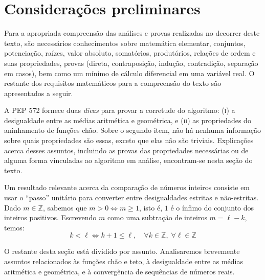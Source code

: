\section*{Considerações preliminares}

Para a apropriada compreensão
das análises e provas realizadas no decorrer deste texto,
são necessários conhecimentos sobre matemática elementar, conjuntos,
potenciação, raízes, valor absoluto, somatórios, produtórios,
relações de ordem e suas propriedades,
provas (direta, contraposição, indução, contradição,
        separação em casos),
bem como um mínimo de cálculo diferencial em uma variável real.
O restante dos requisitos matemáticos para a compreensão do texto
são apresentados a seguir.

A PEP 572 fornece duas \emph{dicas}
para provar a corretude do algoritmo:
\textsc{(i)} a desigualdade entre as médias aritmética e geométrica,
e \textsc{(ii)} as propriedades do aninhamento de funções chão.
Sobre o segundo item,
não há nenhuma informação sobre quais propriedades são essas,
exceto que elas não são triviais.
Explicações acerca desses assuntos,
incluindo as provas das propriedades necessárias
ou de alguma forma vinculadas ao algoritmo em análise,
encontram-se nesta seção do texto.

Um resultado relevante acerca da comparação de números inteiros
consiste em usar o ``passo'' unitário
para converter entre desigualdades estritas e não-estritas.
Dado $m \in \mathds{Z}$, sabemos que $m > 0 \iff m \ge 1$,
isto é, $1$ é o ínfimo do conjunto dos inteiros positivos.
Escrevendo $m$ como uma subtração de inteiros $m = \ell - k$, temos:
\begin{equation}\label{int+1}
  k < \ell \iff k + 1 \le \ell,
  \quad \forall k \in \mathds{Z}, \; \forall \ell \in \mathds{Z}
\end{equation}

O restante desta seção está dividido por assunto.
Analisaremos brevemente assuntos relacionados
às funções chão e teto,
à desigualdade entre as médias aritmética e geométrica,
e à convergência de sequências de números reais.





